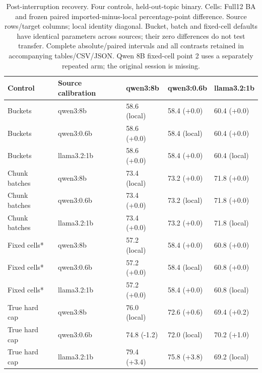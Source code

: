 \begin{table}[t]\centering\fontsize{8}{9.5}\selectfont
\setlength{\tabcolsep}{3pt}
\caption{Post-interruption recovery. Four controls, held-out-topic binary. Cells: Full12 BA and frozen paired imported-minus-local percentage-point difference. Source rows/target columns; local identity diagonal. Bucket, batch and fixed-cell defaults have identical parameters across sources; their zero differences do not test transfer. Complete absolute/paired intervals and all contrasts retained in accompanying tables/CSV/JSON. Qwen 8B fixed-cell point 2 uses a separately repeated arm; the original session is missing.}
\begin{tabular}{lllll}\toprule
Control & Source calibration & qwen3:8b & qwen3:0.6b & llama3.2:1b\\\midrule
Buckets & qwen3:8b & 58.6 (local) & 58.4 (+0.0) & 60.4 (+0.0)\\
Buckets & qwen3:0.6b & 58.6 (+0.0) & 58.4 (local) & 60.4 (+0.0)\\
Buckets & llama3.2:1b & 58.6 (+0.0) & 58.4 (+0.0) & 60.4 (local)\\
\midrule
Chunk batches & qwen3:8b & 73.4 (local) & 73.2 (+0.0) & 71.8 (+0.0)\\
Chunk batches & qwen3:0.6b & 73.4 (+0.0) & 73.2 (local) & 71.8 (+0.0)\\
Chunk batches & llama3.2:1b & 73.4 (+0.0) & 73.2 (+0.0) & 71.8 (local)\\
\midrule
Fixed cells* & qwen3:8b & 57.2 (local) & 58.4 (+0.0) & 60.8 (+0.0)\\
Fixed cells* & qwen3:0.6b & 57.2 (+0.0) & 58.4 (local) & 60.8 (+0.0)\\
Fixed cells* & llama3.2:1b & 57.2 (+0.0) & 58.4 (+0.0) & 60.8 (local)\\
\midrule
True hard cap & qwen3:8b & 76.0 (local) & 72.6 (+0.6) & 69.4 (+0.2)\\
True hard cap & qwen3:0.6b & 74.8 (-1.2) & 72.0 (local) & 70.2 (+1.0)\\
True hard cap & llama3.2:1b & 79.4 (+3.4) & 75.8 (+3.8) & 69.2 (local)\\
\bottomrule\end{tabular}
\end{table}
